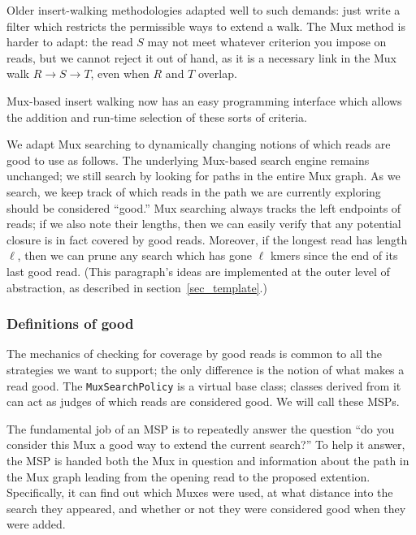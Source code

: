 \documentclass[11pt]{article}
\begin{document}
Older insert-walking methodologies adapted well to such demands: just write a filter
which restricts the permissible ways to extend a walk.  The Mux method is harder to
adapt: the read $S$ may not meet whatever criterion you impose on reads, but we
cannot reject it out of hand, as it is a necessary link in the Mux walk $R\to S\to T$,
even when $R$ and $T$ overlap.  

Mux-based insert walking now has an easy programming interface 
which allows the addition and run-time selection of these sorts of criteria.

We adapt Mux searching to dynamically changing notions of which reads are good
to use as follows.  The underlying Mux-based search engine remains unchanged;
we still search by looking for paths in the entire Mux graph.  As we search, we keep
track of which reads in the path we are currently exploring should be considered ``good.''
Mux searching always tracks the left endpoints of reads; if we also note their lengths, 
then we can easily verify that any potential closure is in fact covered by good reads.  
Moreover, if the longest read has length $\ell$, then we can prune any search which has
gone $\ell$ kmers since the end of its last good read.  (This paragraph's ideas are
implemented at the outer level of abstraction, as described in section~\ref{sec_template}.)

\subsubsection*{Definitions of good}

The mechanics of checking for coverage by good reads is common to all the strategies 
we want to support; the only difference is the notion of what makes a read good.  
The {\tt MuxSearchPolicy} is a virtual base class; classes derived from it can act as
judges of which reads are considered good.  We will call these MSPs.

The fundamental job of an MSP is to repeatedly answer the question ``do you
consider this Mux a good way to extend the current search?''  To help it answer, 
the MSP is handed both the Mux in question and information about the path in the
Mux graph leading from the opening read to the proposed extention.  Specifically,
it can find out which Muxes were used, at what distance into the search they appeared,
and whether or not they were considered good when they were added.
\end{document}
